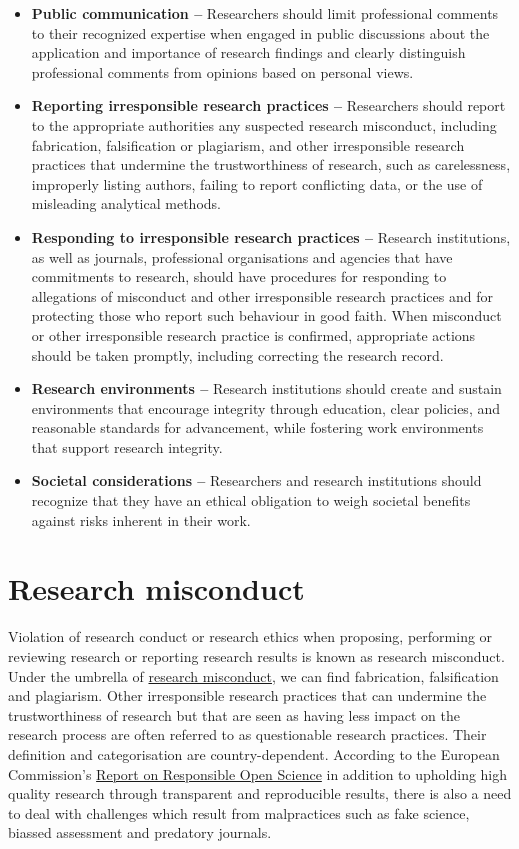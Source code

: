 \documentclass[
]{book}
\begin{document}
\begin{itemize}
\item
  \textbf{Public communication --} Researchers should limit professional comments to their recognized expertise when engaged in public discussions about the application and importance of research findings and clearly distinguish professional comments from opinions based on personal views.
\item
  \textbf{Reporting irresponsible research practices --} Researchers should report to the appropriate authorities any suspected research misconduct, including fabrication, falsification or plagiarism, and other irresponsible research practices that undermine the trustworthiness of research, such as carelessness, improperly listing authors, failing to report conflicting data, or the use of misleading analytical methods.
\item
  \textbf{Responding to irresponsible research practices --} Research institutions, as well as journals, professional organisations and agencies that have commitments to research, should have procedures for responding to allegations of misconduct and other irresponsible research practices and for protecting those who report such behaviour in good faith. When misconduct or other irresponsible research practice is confirmed, appropriate actions should be taken promptly, including correcting the research record.
\item
  \textbf{Research environments --} Research institutions should create and sustain environments that encourage integrity through education, clear policies, and reasonable standards for advancement, while fostering work environments that support research integrity.
\item
  \textbf{Societal considerations --} Researchers and research institutions should recognize that they have an ethical obligation to weigh societal benefits against risks inherent in their work.
\end{itemize}

\hypertarget{research-misconduct}{%
\section{Research misconduct}\label{research-misconduct}}

Violation of research conduct or research ethics when proposing, performing or reviewing research or reporting research results is known as research misconduct. Under the umbrella of \href{https://en.wikipedia.org/wiki/Scientific_misconduct}{research misconduct}, we can find fabrication, falsification and plagiarism. Other irresponsible research practices that can undermine the trustworthiness of research but that are seen as having less impact on the research process are often referred to as questionable research practices. Their definition and categorisation are country-dependent. According to the European Commission's \href{https://ec.europa.eu/info/sites/default/files/policy_briefing_swafs-30-2020.pdf}{Report on Responsible Open Science} in addition to upholding high quality research through transparent and reproducible results, there is also a need to deal with challenges which result from malpractices such as fake science, biassed assessment and predatory journals.
\end{document}
